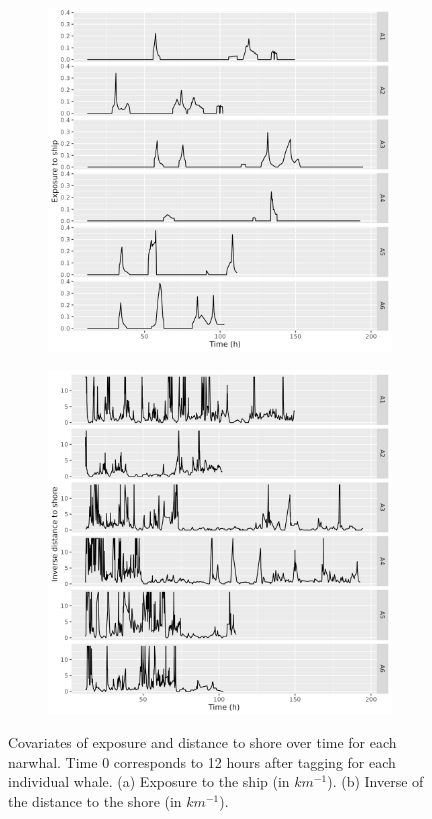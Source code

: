 \documentclass[aoas]{imsart}
\theoremstyle{definition}
\theoremstyle{remark}
\theoremstyle{remark}
\newcommand {\1}{\mathbb{1}}
\begin{document}
\begin{figure}[ht!]
	\centering
	\begin{subfigure}{0.49\textwidth}
		\centering
		\includegraphics[scale=0.40]{images/data_exploration/realExpShip_through_time.png}
		\caption{}
	\end{subfigure}
	\begin{subfigure}{0.49\textwidth}
		\centering
		\includegraphics[scale=0.40]{images/data_exploration/realExpShore_through_time.png}
		\caption{}
	\end{subfigure}
	\caption{Covariates of exposure and distance to shore over time for each narwhal. Time 0 corresponds to 12 hours after tagging for each individual whale. (a) Exposure to the ship (in $km^{-1}$). (b) Inverse of the distance to the shore (in $km^{-1}$).}  
	\label{fig: realexpthroughtime}
\end{figure}
\end{document}
